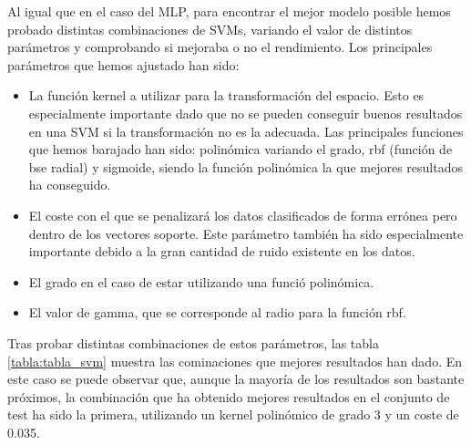 \documentclass[journal,twoside]{JoPhA}
\begin{document}
	Al igual que en el caso del MLP, para encontrar el mejor modelo posible hemos probado distintas combinaciones de SVMs, variando el valor de distintos parámetros y comprobando si mejoraba o no el rendimiento. Los principales parámetros que hemos ajustado han sido: \\
	
	\begin{itemize} 
		\item La función kernel a utilizar  para la transformación del espacio. Esto es especialmente importante dado que no se pueden conseguir buenos resultados en una SVM si la transformación no es la adecuada. Las principales funciones que hemos barajado han sido: polinómica variando el grado, rbf (función de bse radial) y sigmoide, siendo la función polinómica la que mejores resultados ha conseguido. \\
		\item El coste con el que se penalizará los datos clasificados de forma errónea pero dentro de los vectores soporte. Este parámetro también ha sido especialmente importante debido a la gran cantidad de ruido existente en los datos. \\
		\item  El grado en el caso de estar utilizando una funció polinómica. \\
		\item El valor de gamma, que se corresponde al radio para la función rbf. \\
	\end{itemize} 

	Tras probar distintas combinaciones de estos parámetros, las tabla \ref{tabla:tabla_svm} muestra las cominaciones que mejores resultados han dado. En este caso se puede observar que, aunque la mayoría de los resultados son bastante próximos, la combinación que ha obtenido mejores resultados en el conjunto de test ha sido la primera, utilizando un kernel polinómico de grado 3 y un coste de 0.035.
	
\end{document}
